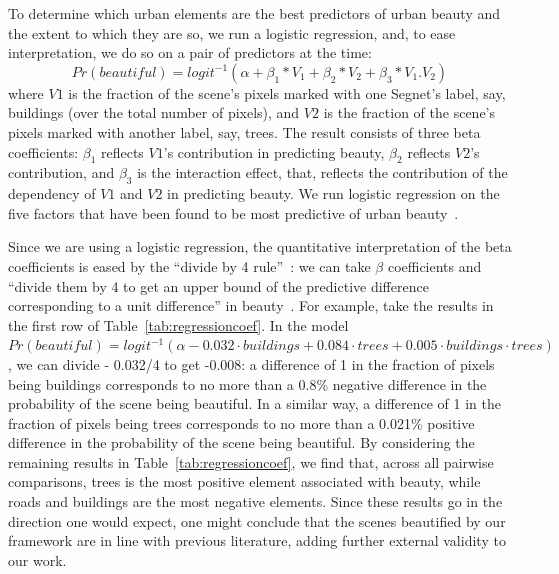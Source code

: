 To determine which urban elements are the best predictors of urban beauty and the extent to which they are so, we run a logistic regression, and, to ease interpretation, we do so on a pair of predictors at the time: 
\begin{equation}
Pr(beautiful) = logit^{-1}(\alpha + \beta_1 * V_1 + \beta_2 * V_2  + \beta_3 * V_{1}.V_{2} )
\label{eq:regression} 
\end{equation}
where $V1$ is the fraction of the scene's pixels marked with one Segnet's label, say, buildings (over the total number of pixels),  and $V2$ is the fraction of the scene's pixels marked with another label, say, trees. The result consists of three beta coefficients: $\beta_1$ reflects $V1$'s contribution in predicting beauty,  $\beta_2$ reflects $V2$'s contribution, and $\beta_3$ is the interaction effect, that, reflects the contribution of the dependency of $V1$ and $V2$ in predicting beauty. We run logistic regression on the five factors that have been found to be most predictive of urban beauty~\cite{quercia2014aesthetic, ewing2013measuring, alexander1977pattern}. 


Since we are using a logistic regression, the quantitative interpretation of the beta coefficients is eased by the ``divide by 4 rule''~\cite{vaughn2008data}: we can take $\beta$ coefficients and ``divide them by 4 to get an upper bound of the predictive difference corresponding to a unit difference'' in beauty~\cite{vaughn2008data}. For example, take the results in the first row of Table~\ref{tab:regressioncoef}. In the model $Pr(beautiful) = logit^{-1}(\alpha - 0.032 \cdot buildings + 0.084 \cdot trees + 0.005 \cdot  buildings \cdot trees)$, we can divide - 0.032/4 to get -0.008: a difference of 1 in the fraction of pixels being buildings corresponds to no more than a 0.8\% negative difference in the probability of the scene being beautiful. In a similar way, a difference of 1 in the fraction of pixels being trees corresponds to no more than a 0.021\% positive difference in the probability of the scene being beautiful. By considering the remaining results in Table~\ref{tab:regressioncoef}, we find that, across all pairwise comparisons, trees is the most positive element associated with beauty, while roads and buildings are the most negative elements. Since these results go in the direction one would expect, one might conclude that the scenes beautified by our framework are in line with previous literature, adding further external validity to our work. 




